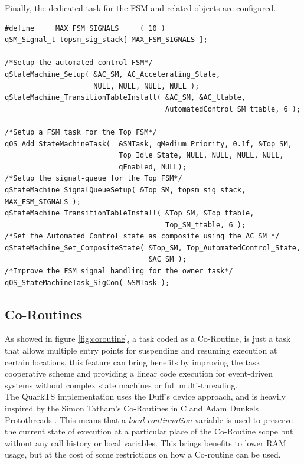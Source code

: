 \documentclass{article}
\begin{document}
Finally, the dedicated task for the FSM and related objects are configured.

\begin{lstlisting}[style=CStyle]
#define     MAX_FSM_SIGNALS     ( 10 )
qSM_Signal_t topsm_sig_stack[ MAX_FSM_SIGNALS ];

/*Setup the automated control FSM*/
qStateMachine_Setup( &AC_SM, AC_Accelerating_State, 
                     NULL, NULL, NULL, NULL );
qStateMachine_TransitionTableInstall( &AC_SM, &AC_ttable, 
                                      AutomatedControl_SM_ttable, 6 );

/*Setup a FSM task for the Top FSM*/    
qOS_Add_StateMachineTask(  &SMTask, qMedium_Priority, 0.1f, &Top_SM, 
                           Top_Idle_State, NULL, NULL, NULL, NULL, 
                           qEnabled, NULL); 
/*Setup the signal-queue for the Top FSM*/
qStateMachine_SignalQueueSetup( &Top_SM, topsm_sig_stack, MAX_FSM_SIGNALS );
qStateMachine_TransitionTableInstall( &Top_SM, &Top_ttable, 
                                      Top_SM_ttable, 6 );
/*Set the Automated Control state as composite using the AC_SM */
qStateMachine_Set_CompositeState( &Top_SM, Top_AutomatedControl_State, 
                                  &AC_SM );
/*Improve the FSM signal handling for the owner task*/
qOS_StateMachineTask_SigCon( &SMTask );
\end{lstlisting}

\subsection{Co-Routines}
As showed in figure \ref{fig:coroutine}, a task coded as a Co-Routine, is just a task that allows multiple entry points for suspending and resuming execution at certain locations, this feature can bring benefits by improving the task cooperative scheme and providing a linear code execution for event-driven systems without complex state machines or full multi-threading. \\


    
The QuarkTS implementation uses the Duff's device approach, and is heavily inspired by the Simon Tatham's Co-Routines in C \cite{tatham} and Adam Dunkels Protothreads \cite{dunkels}. This means that a \textit{local-continuation} variable is used to preserve the current state of execution at a particular place of the Co-Routine scope but without any call history or local variables. This brings benefits to lower RAM usage, but at the cost of some restrictions on how a Co-routine can be used. \\
\end{document}
